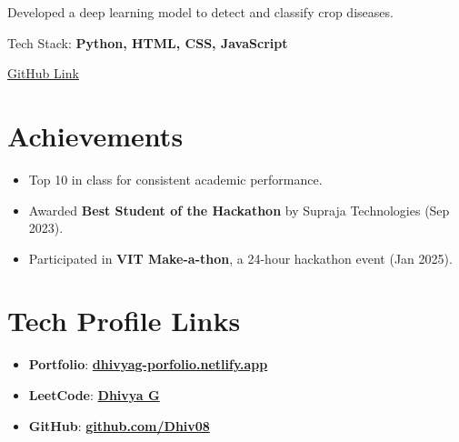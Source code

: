 \documentclass[]{deedy-resume-openfont}
\begin{document}
\begin{minipage}[t]{0.49\textwidth}
\begin{tightemize}
\item Developed a deep learning model to detect and classify crop diseases.
\item Tech Stack: {\bf Python, HTML, CSS, JavaScript}
\item \href{https://github.com/Dhiv08/CropDoc-HARNESSING-TENSORFLOW-FOR-EARLY-DETECTION-AND-PREDICTION-OF-CROP-DISEASES}{GitHub Link}
\end{tightemize}



\vspace{4pt}

\section*{\textbf{Achievements}}
\vspace{2pt}

\begin{itemize}
  \item Top 10 in class for consistent academic performance.
\end{itemize}


\begin{itemize}
  \item Awarded \textbf{Best Student of the Hackathon} by Supraja Technologies (Sep 2023).
  \item Participated in \textbf{VIT Make-a-thon}, a 24-hour hackathon event (Jan 2025).
\end{itemize}





\section{Tech Profile Links}
\vspace{4pt}
\begin{itemize}
\item \textbf{Portfolio}: \href{https://dhivyag-porfolio.netlify.app/}{\bf dhivyag-porfolio.netlify.app}
\item \textbf{LeetCode}: \href{https://leetcode.com/u/HHATnMOjx7/}{\bf Dhivya G}
\item \textbf{GitHub}: \href{https://github.com/Dhiv08}{\bf github.com/Dhiv08}
\end{itemize}


\end{minipage} 
\end{document}
